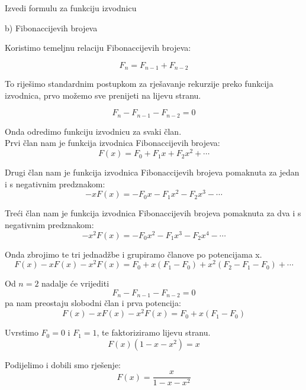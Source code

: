 \documentclass[exam.tex]{subfiles}
\begin{document}
	Izvedi formulu za funkciju izvodnicu
	
	b) Fibonaccijevih brojeva
	
	Koristimo temeljnu relaciju Fibonaccijevih brojeva:
	
	\[ F_n = F_{n - 1} + F_{n - 2} \]
	
	To riješimo standardnim postupkom za rješavanje rekurzije preko funkcija izvodnica, prvo možemo sve prenijeti na lijevu stranu.
	
	\[ F_n - F_{n - 1} - F_{n - 2} = 0 \]
	
	Onda odredimo funkciju izvodnicu za svaki član. \\
	
	Prvi član nam je funkcija izvodnica Fibonaccijevih brojeva: 
	\[ F(x) = F_0 + F_1 x + F_2 x^2 + \cdots \]
	
	Drugi član nam je funkcija izvodnica Fibonaccijevih brojeva pomaknuta za jedan i s negativnim predznakom:
	\[ - x F(x) = - F_0 x - F_1 x^2 - F_2 x^3 - \cdots \]
	
	Treći član nam je funkcija izvodnica Fibonaccijevih brojeva pomaknuta za dva i s negativnim predznakom:
	\[ - x^2 F(x) = - F_0 x^2 - F_1 x^3 - F_2 x^4 - \cdots \]
	
	Onda zbrojimo te tri jednadžbe i grupiramo članove po potencijama x.
	\[ F(x) - x F(x) - x^2 F(x) = F_0 + x (F_1 - F_0) + x^2 (F_2 - F_1 - F_0) + \cdots \]
	
	Od \( n = 2 \) nadalje će vrijediti \[ F_n - F_{n - 1} - F_{n - 2} = 0 \] pa nam preostaju slobodni član i prva potencija:
	\[ F(x) - x F(x) - x^2 F(x) = F_0 + x (F_1 - F_0) \]
	
	Uvrstimo \( F_0 = 0 \) i \( F_1 = 1 \), te faktoriziramo lijevu stranu.
	\[ F(x)(1 - x - x^2) = x \]
	
	Podijelimo i dobili smo rješenje:
	\[ F(x) = \frac{x}{1 - x - x^2} \]
\end{document}
